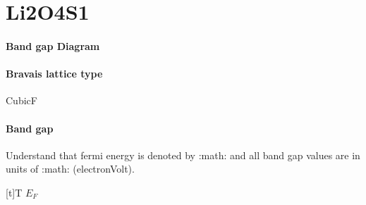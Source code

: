 \documentclass[letterpaper,10pt,english]{sphinxmanual}
\begin{document}
\chapter{Li2O4S1}
\label{\detokenize{Li2O4S1/Li2O4S1:li2o4s1}}\label{\detokenize{Li2O4S1/Li2O4S1::doc}}\subsubsection*{Band gap Diagram}

\noindent{}
\subsubsection*{Bravais lattice type}

\sphinxAtStartPar
CubicF
\subsubsection*{Band gap}

\sphinxAtStartPar
Understand that fermi energy is denoted by :math: and all band gap values are in units of :math: (electron\sphinxhyphen{}Volt).


\begin{savenotes}\sphinxattablestart
\sphinxthistablewithglobalstyle
\centering
\begin{tabulary}{\linewidth}[t]{T}
\sphinxtoprule
\sphinxstyletheadfamily 
\sphinxAtStartPar
\(E_F\)
\\
\sphinxmidrule
\sphinxtableatstartofbodyhook
{}
\\
\sphinxbottomrule
\end{tabulary}
\sphinxtableafterendhook\par
\sphinxattableend\end{savenotes}
\end{document}
